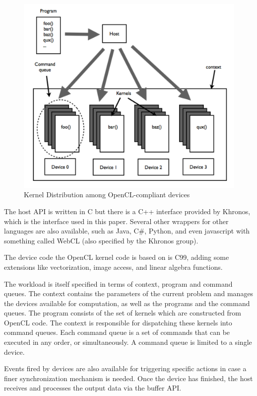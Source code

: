 \begin{figure}
\caption{Kernel Distribution among OpenCL-compliant devices}
\centering
\includegraphics[scale=0.5]{OpenCL_Objects.pdf}
\end{figure}

The host \gls{API} is written in C but there is a C++ interface provided by Khronos, which is the interface used in this paper. Several other wrappers for other languages are also available, such as Java, C\#, Python, and even javascript with something called WebCL (also specified by the Khronos group). 

The device code the \gls{OpenCL} kernel code is based on is C99, adding some extensions like vectorization, image access, and linear algebra functions.

The workload is itself specified in terms of context, program and command queues. The context contains the parameters of the current problem and manages the devices available for computation, as well as the programs and the command queues. The program consists of the set of kernels which are constructed from \gls{OpenCL} code. The context is responsible for dispatching these kernels into command queues. Each command queue is a set of commands that can be executed in any order, or simultaneously. A command queue is limited to a single device.

Events fired by devices are also available for triggering specific actions in case a finer synchronization mechanism is needed. Once the device has finished, the host receives and processes the output data via the buffer \gls{API}.

